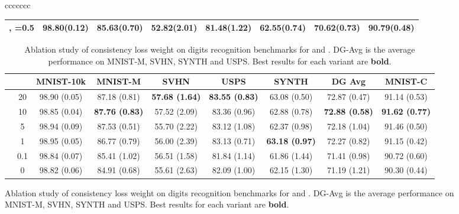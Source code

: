 \documentclass{article} \usepackage{iclr2021_conference,times}
\begin{document}
\begin{figure}[t]
\begin{center}
\begin{adjustbox}{max width=\textwidth}
\begin{tabular}{ccccccc}
\begin{table}[htp]
\begin{tabular}{l|c|ccccc|c}
		\tiny, =0.5 & 98.80\tiny(0.12) & 85.63\tiny(0.70)          & 52.82\tiny(2.01)          & 81.48\tiny(1.22)          & 62.55\tiny(0.74)          & 70.62\tiny(0.73)          & 90.79\tiny(0.48)              \\
\bottomrule
	\end{tabular}
\end{table}
\begin{table}[htp]
	\small
	\centering
	\setlength{\tabcolsep}{3pt}
	\caption{Ablation study of consistency loss weight  on digits recognition benchmarks for  and . DG-Avg is the average performance on MNIST-M, SVHN, SYNTH and USPS. Best results for each variant are \textbf{bold}.}
	\label{digits-consistency}
	\begin{tabular}{l|c|c|ccccc|c}
		\toprule
		& & MNIST-10k    & MNIST-M    & SVHN        & USPS        & SYNTH       & DG Avg         & MNIST-C     \\
		\midrule
		\multirow{6}{*}{} & 20   & 98.90 \tiny(0.05) & 87.18 \tiny(0.81)          & \textbf{57.68 \tiny(1.64)} & \textbf{83.55 \tiny(0.83)} & 63.08 \tiny(0.50)          & 72.87 \tiny(0.47)          & 91.14 \tiny(0.53)          \\
		& 10   & 98.85 \tiny(0.04) & \textbf{87.76 \tiny(0.83)} & 57.52 \tiny(2.09)          & 83.36 \tiny(0.96)          & 62.88 \tiny(0.78)          & \textbf{72.88 \tiny(0.58)} & \textbf{91.62 \tiny(0.77)} \\
		& 5    & 98.94 \tiny(0.09) & 87.53 \tiny(0.51)          & 55.70 \tiny(2.22)          & 83.12 \tiny(1.08)          & 62.37 \tiny(0.98)          & 72.18 \tiny(1.04)          & 91.46 \tiny(0.50)          \\
		& 1    & 98.95 \tiny(0.05) & 86.77 \tiny(0.79)          & 56.00 \tiny(2.39)          & 83.13 \tiny(0.71)          & \textbf{63.18 \tiny(0.97)} & 72.27 \tiny(0.82)          & 91.15 \tiny(0.42)          \\
		& 0.1  & 98.84 \tiny(0.07) & 85.41 \tiny(1.02)          & 56.51 \tiny(1.58)          & 81.84 \tiny(1.14)          & 61.86 \tiny(1.44)          & 71.41 \tiny(0.98)          & 90.72 \tiny(0.60)          \\
		& 0    & 98.82 \tiny(0.06) & 84.91 \tiny(0.68)          & 55.61 \tiny(2.63)          & 82.09 \tiny(1.00)          & 62.15 \tiny(1.30)          & 71.19 \tiny(1.21)          & 90.30 \tiny(0.44)          \\
		

\end{tabular}
\end{table}
\end{tabular}
\end{adjustbox}
\end{center}
\end{figure}
\end{document}
